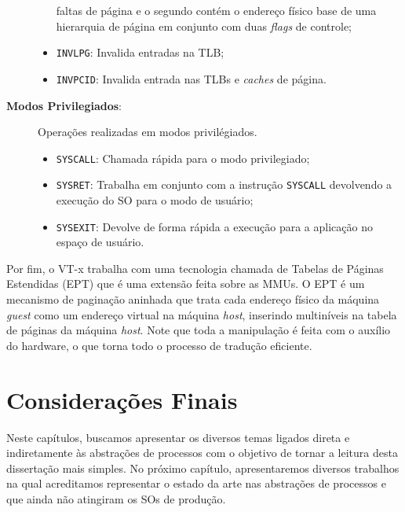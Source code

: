 \begin{description}
\begin{itemize}
faltas de página e o segundo contém o endereço físico base de uma hierarquia de
página em conjunto com duas \emph{flags} de controle;
			\item \texttt{INVLPG}: Invalida entradas na TLB;
			\item \texttt{INVPCID}: Invalida entrada nas TLBs e \emph{caches} de
página.
		\end{itemize}
	\item [\textbf{Modos Privilegiados}:] Operações realizadas em modos
privilégiados.
		\begin{itemize}
			\item \texttt{SYSCALL}: Chamada rápida para o modo privilegiado;
			\item \texttt{SYSRET}: Trabalha em conjunto com a instrução
\texttt{SYSCALL} devolvendo a execução do SO para o modo de usuário;
			\item \texttt{SYSEXIT}: Devolve de forma rápida a execução para a
aplicação no espaço de usuário.
		\end{itemize}
\end{description}

Por fim, o VT-x trabalha com uma tecnologia chamada de Tabelas de Páginas
Estendidas (EPT) que é uma extensão feita sobre as MMUs. O EPT é um mecanismo
de paginação aninhada que trata cada endereço físico da máquina \emph{guest}
como um endereço virtual na máquina \emph{host}, inserindo multiníveis na
tabela de páginas da máquina \emph{host}. Note que toda a manipulação é feita
com o auxílio do hardware, o que torna todo o processo de tradução eficiente.

\section{Considerações Finais}

Neste capítulos, buscamos apresentar os diversos temas ligados direta e
indiretamente às abstrações de processos com o objetivo de tornar a leitura
desta dissertação mais simples. No próximo capítulo, apresentaremos diversos
trabalhos na qual acreditamos representar o estado da arte nas abstrações de
processos e que ainda não atingiram os SOs de produção.

